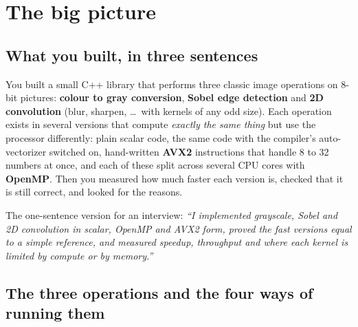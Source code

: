 \chapter{The big picture}\label{ch:overview}

\section{What you built, in three sentences}

You built a small C++ library that performs three classic image operations on 8-bit pictures: \textbf{colour to gray conversion}, \textbf{Sobel edge detection} and \textbf{2D convolution} (blur, sharpen, \dots\ with kernels of any odd size). Each operation exists in several versions that compute \emph{exactly the same thing} but use the processor differently: plain scalar code, the same code with the compiler's auto-vectorizer switched on, hand-written \textbf{AVX2} instructions that handle 8 to 32 numbers at once, and each of these split across several CPU cores with \textbf{OpenMP}. Then you measured how much faster each version is, checked that it is still correct, and looked for the reasons.

\begin{plain}
The one-sentence version for an interview: \emph{``I implemented grayscale, Sobel and 2D convolution in scalar, OpenMP and AVX2 form, proved the fast versions equal to a simple reference, and measured speedup, throughput and where each kernel is limited by compute or by memory.''}
\end{plain}

\section{The three operations and the four ways of running them}

